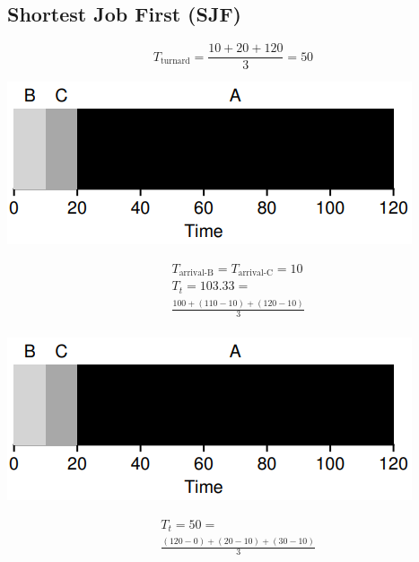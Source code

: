 \documentclass[8pt,a4paper,landscape]{extarticle}
\begin{document}
\begin{multicols*}{3}
\begin{minipage}{.5\linewidth}
\section*{Shortest Job First (SJF)}
\begin{equation*}
  T_{\text{turnard}} = \frac{10+20+120}{3} = 50
\end{equation*}
\end{minipage}
\begin{minipage}{.5\linewidth}
  \includegraphics[width=\linewidth]{imgs/sched_fifo3}
\end{minipage}
\begin{minipage}{.5\linewidth}
  \begin{align*}
    & T_{\text{arrival-B}} = T_{\text{arrival-C}} = 10 \\
    & T_{t} = 103.33 = \\
    &\frac{100+(110-10)+(120-10)}{3} \\
  \end{align*}
\end{minipage}
\begin{minipage}{.5\linewidth}
  \includegraphics[width=\linewidth]{imgs/sched_fifo3}
\end{minipage}
\begin{minipage}{.5\linewidth}
  \begin{align*}
    & T_{t} = 50 = \\
    & \frac{(120-0)+(20-10)+(30-10)}{3} \\

\end{align*}
\end{minipage}
\end{multicols*}
\end{document}

